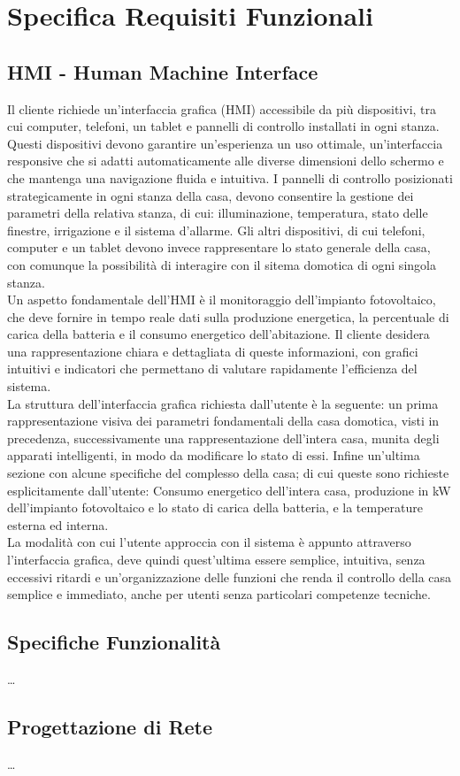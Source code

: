 \documentclass[italian, 12pt, a4paper]{article}
\begin{document}
\clearpage
\section{Specifica Requisiti Funzionali}\label{sec:requisiti2}
\subsection{HMI - Human Machine Interface}
Il cliente richiede un’interfaccia grafica (HMI) accessibile da più dispositivi, tra cui computer, telefoni, un tablet e pannelli di controllo installati in ogni stanza. Questi dispositivi devono garantire un'esperienza un uso ottimale, un'interfaccia responsive che si adatti automaticamente alle diverse dimensioni dello schermo e che mantenga una navigazione fluida e intuitiva.  I pannelli di controllo posizionati strategicamente in ogni stanza della casa, devono consentire la gestione dei parametri della relativa stanza, di cui: illuminazione, temperatura, stato delle finestre, irrigazione e il sistema d’allarme. Gli altri dispositivi, di cui telefoni, computer e un tablet devono invece rappresentare lo stato generale della casa, con comunque la possibilità di interagire con il sitema domotica di ogni singola stanza.\\[1.5mm]
Un aspetto fondamentale dell’HMI è il monitoraggio dell’impianto fotovoltaico, che deve fornire in tempo reale dati sulla produzione energetica, la percentuale di carica della batteria e il consumo energetico dell’abitazione. Il cliente desidera una rappresentazione chiara e dettagliata di queste informazioni, con grafici intuitivi e indicatori che permettano di valutare rapidamente l’efficienza del sistema.\\[1.5mm]
La struttura dell’interfaccia grafica richiesta dall’utente è la seguente: un prima rappresentazione visiva dei parametri fondamentali della casa domotica, visti in precedenza, successivamente una rappresentazione dell’intera casa, munita degli apparati intelligenti, in modo da modificare lo stato di essi. Infine un’ultima sezione con alcune specifiche del complesso della casa; di cui queste sono richieste esplicitamente dall’utente: Consumo energetico dell’intera casa, produzione in kW dell’impianto fotovoltaico e lo stato di carica della batteria, e la temperature esterna ed interna.\\[1.5mm]
La modalità con cui l’utente approccia con il sistema è appunto attraverso l’interfaccia grafica, deve quindi quest’ultima essere semplice, intuitiva, senza eccessivi ritardi e un’organizzazione delle funzioni che renda il controllo della casa semplice e immediato, anche per utenti senza particolari competenze tecniche.
\subsection{Specifiche Funzionalità}
\ldots
\subsection{Progettazione di Rete}
\ldots
\clearpage
\end{document}

